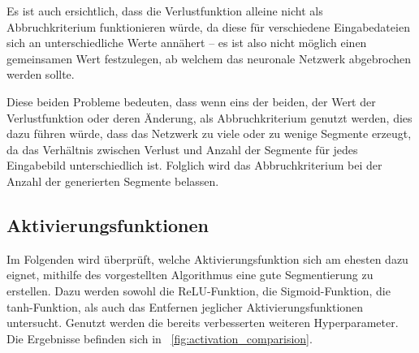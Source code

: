Es ist auch ersichtlich, dass die Verlustfunktion alleine nicht als Abbruchkriterium funktionieren würde, da diese für verschiedene Eingabedateien sich an unterschiedliche Werte annähert -- es ist also nicht möglich einen gemeinsamen Wert festzulegen, ab welchem das neuronale Netzwerk abgebrochen werden sollte.

Diese beiden Probleme bedeuten, dass wenn eins der beiden, der Wert der Verlustfunktion oder deren Änderung, als Abbruchkriterium genutzt werden, dies dazu führen würde, dass das Netzwerk zu viele oder zu wenige Segmente erzeugt, da das Verhältnis zwischen Verlust und Anzahl der Segmente für jedes Eingabebild unterschiedlich ist. Folglich wird das Abbruchkriterium bei der Anzahl der generierten Segmente belassen.

\subsection{Aktivierungsfunktionen}
\label{ssec:exp_architecture_activation}

Im Folgenden wird überprüft, welche Aktivierungsfunktion sich am ehesten dazu eignet, mithilfe des vorgestellten Algorithmus eine gute Segmentierung zu erstellen. Dazu werden sowohl die ReLU-Funktion, die Sigmoid-Funktion, die tanh-Funktion, als auch das Entfernen jeglicher Aktivierungsfunktionen untersucht. Genutzt werden die bereits verbesserten weiteren Hyperparameter. Die Ergebnisse befinden sich in \figurename~\ref{fig:activation_comparision}.

